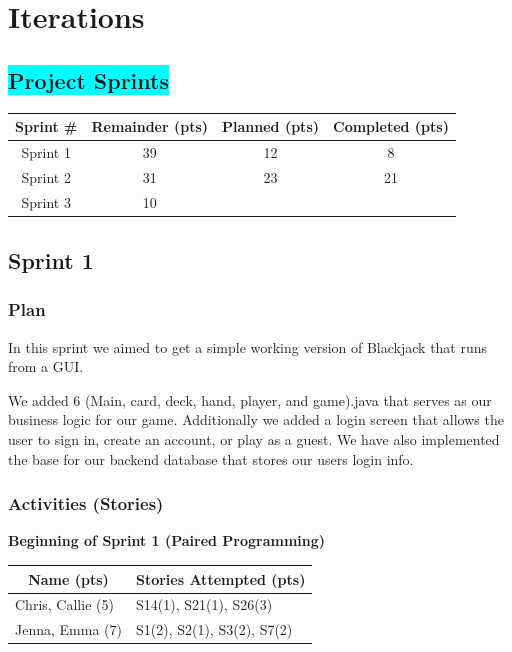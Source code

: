 \section{Iterations} 

\subsection{\colorbox{cyan}{Project Sprints}}

\begin{table}[!hbt]
\begin{tabular}{|c|c|c|c|}
\hline
\textbf{Sprint \#} & \textbf{Remainder (pts)} & \textbf{Planned (pts)} & \textbf{Completed (pts)} \\ \hline
Sprint 1 & 39 & 12 & 8  \\ \hline
Sprint 2 & 31 & 23 & 21 \\ \hline
Sprint 3 & 10 &    &    \\ \hline
\end{tabular}
\end{table}

\subsection{Sprint 1}

\subsubsection{Plan}
In this sprint we aimed to get a simple working version of Blackjack that runs from a GUI.

\noindent We added 6 (Main, card, deck, hand, player, and game).java that serves as our business logic for our game. Additionally we added a login screen that allows the user to sign in, create an account, or play as a guest. We have also implemented the base for our backend database that stores our users login info.

\subsubsection{Activities (Stories)}

\textbf{Beginning of Sprint 1 (Paired Programming)}

\begin{table}[!hbt]
\begin{tabular}{|l|l|}
\hline
\multicolumn{1}{|c|}{\textbf{Name (pts)}} & \multicolumn{1}{c|}{\textbf{Stories Attempted (pts)}} \\ \hline
Chris, Callie (5)                         & S14(1), S21(1), S26(3)                                \\ \hline
Jenna, Emma (7)                           & S1(2), S2(1), S3(2), S7(2)                            \\ \hline
\end{tabular}
\end{table}




